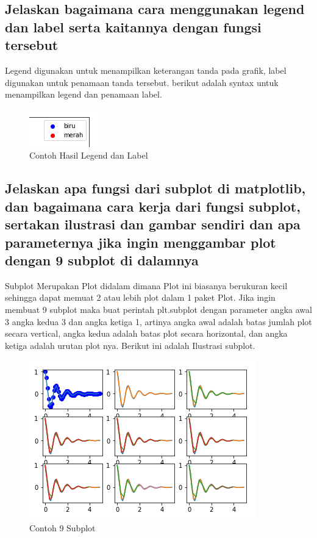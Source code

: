 \subsection{Jelaskan bagaimana cara menggunakan legend dan label serta kaitannya dengan fungsi tersebut}
Legend digunakan untuk menampilkan keterangan tanda pada grafik, label digunakan untuk penamaan tanda tersebut.
berikut adalah syntax untuk menampilkan legend dan penamaan label.



\begin{figure}[h]
\centering
\includegraphics[scale=1]{figures/6/Teori/1174025/no4lg.png}
\caption{Contoh Hasil Legend dan Label}
\label{fig:contoh Legend}
\end{figure}

\subsection{Jelaskan apa fungsi dari subplot di matplotlib, dan bagaimana cara kerja dari fungsi subplot, sertakan ilustrasi dan gambar sendiri dan apa parameternya jika ingin menggambar plot dengan 9 subplot di dalamnya}
Subplot Merupakan Plot didalam dimana Plot ini biasanya berukuran kecil sehingga dapat memuat 2 atau lebih plot dalam 1 paket Plot.\newline
Jika ingin membuat 9 subplot maka buat perintah plt.subplot dengan parameter angka awal 3 angka kedua 3 dan angka ketiga 1, artinya angka awal adalah batas jumlah plot secara vertical, angka kedua adalah batas plot secara horizontal, dan angka ketiga adalah urutan plot nya.
Berikut ini adalah Ilustrasi subplot.



\begin{figure}[h]
\centering
\includegraphics[scale=0.7]{figures/6/Teori/1174025/subplot.png}
\caption{Contoh 9 Subplot}
\label{fig:contoh subplot}
\end{figure}

